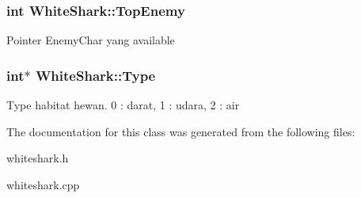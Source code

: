 \subsubsection[{\texorpdfstring{Top\+Enemy}{TopEnemy}}]{\setlength{\rightskip}{0pt plus 5cm}int White\+Shark\+::\+Top\+Enemy\hspace{0.3cm}{\ttfamily [protected]}}\hypertarget{class_white_shark_a4ab4c2fd5825a20d1ecfbe85715433f7}{}\label{class_white_shark_a4ab4c2fd5825a20d1ecfbe85715433f7}
Pointer Enemy\+Char yang available 
\subsubsection[{\texorpdfstring{Type}{Type}}]{\setlength{\rightskip}{0pt plus 5cm}int$\ast$ White\+Shark\+::\+Type\hspace{0.3cm}{\ttfamily [protected]}}\hypertarget{class_white_shark_a6532b6645a1442b89ad3d15d65d0d6bd}{}\label{class_white_shark_a6532b6645a1442b89ad3d15d65d0d6bd}
Type habitat hewan. 0 \+: darat, 1 \+: udara, 2 \+: air 

The documentation for this class was generated from the following files\+:\begin{DoxyCompactItemize}
\item 
whiteshark.\+h\item 
whiteshark.\+cpp\end{DoxyCompactItemize}

